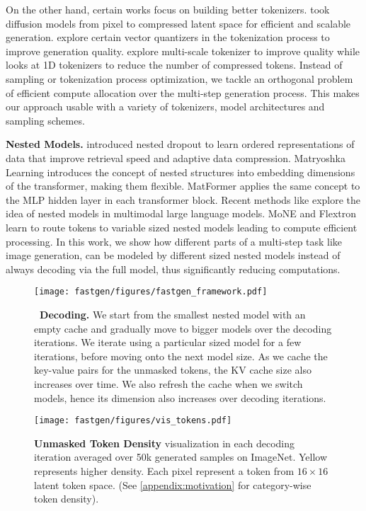 On the other hand, certain works focus on building better tokenizers. \citet{ldm} took diffusion models from pixel to compressed latent space for efficient and scalable generation.  \cite{yu2023language,weber2024maskbitembeddingfreeimagegeneration} explore certain vector quantizers in the tokenization process to improve generation quality. \citet{tian2024visualautoregressivemodelingscalable} explore multi-scale tokenizer to improve quality while \citet{yu2024imageworth32tokens} looks at 1D tokenizers to reduce the number of compressed tokens. Instead of sampling or tokenization process optimization, we tackle an orthogonal problem of efficient compute allocation over the multi-step generation process. This makes our approach usable with a variety of tokenizers, model architectures and sampling schemes.

{\flushleft \textbf{Nested Models.}} \citet{rippel2014learning} introduced nested dropout to learn ordered representations of data that improve retrieval speed and adaptive data compression. Matryoshka Learning \citep{kusupati2022matryoshka} introduces the concept of nested structures into embedding dimensions of the transformer, making them flexible. MatFormer \citep{kudugunta2023matformer} applies
the same concept to the MLP hidden layer in each transformer block. Recent methods like \citep{cai2024matryoshka, hu2024matryoshka} explore the idea of nested models in multimodal large language models. MoNE \citep{jain2024mixturenestedexpertsadaptive} and Flextron \citep{cai2024flextron} learn to route tokens to variable sized nested models  leading to compute efficient processing. In this work, we show how different parts of a multi-step task like image generation, can be modeled by different sized nested models instead of always decoding via the full model, thus significantly reducing computations.






\begin{figure*}[t]
    \centering
    \texttt{[image: fastgen/figures/fastgen\_framework.pdf]}
    \caption{\small \textbf{\ours \ Decoding.} We start from the smallest nested model with an empty cache and gradually move to bigger models over the decoding iterations. We iterate using a particular sized model for a few iterations, before moving onto the next model size. As we cache the key-value pairs for the unmasked tokens, the KV cache size also increases over time. We also refresh the cache when we switch models, hence its dimension also increases over decoding iterations.}
    \label{fig:main_algo}
\end{figure*}

\begin{figure*}[h]
    \centering
    \texttt{[image: fastgen/figures/vis\_tokens.pdf]}
    \caption{\small \textbf{Unmasked Token Density} visualization in each decoding iteration averaged over 50k generated samples on ImageNet. Yellow represents higher density. Each pixel represent a token from $16 \times 16$ latent token space. (See \cref{appendix:motivation} for category-wise token density).}
    \label{fig:vis_tokens}
\end{figure*}